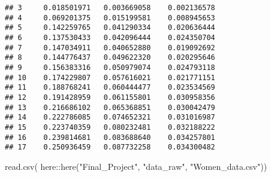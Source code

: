 \documentclass[
]{article}
\newenvironment{Shaded}{\begin{snugshade}}{\end{snugshade}}
\newcommand{\FunctionTok}[1]{\textcolor[rgb]{0.00,0.00,0.00}{#1}}
\newcommand{\NormalTok}[1]{#1}
\newcommand{\SpecialCharTok}[1]{\textcolor[rgb]{0.00,0.00,0.00}{#1}}
\newcommand{\StringTok}[1]{\textcolor[rgb]{0.31,0.60,0.02}{#1}}
\begin{document}
\begin{verbatim}
## 3     0.018501971   0.003669058    0.002136578
## 4     0.069201375   0.015199581    0.008945653
## 5     0.142259765   0.041290334    0.020636444
## 6     0.137530433   0.042096444    0.024350704
## 7     0.147034911   0.040652880    0.019092692
## 8     0.144776437   0.049622320    0.020295646
## 9     0.156383316   0.050979074    0.024793118
## 10    0.174229807   0.057616021    0.021771151
## 11    0.188768241   0.060444477    0.023534569
## 12    0.191428959   0.061155801    0.030958356
## 13    0.216686102   0.065368851    0.030042479
## 14    0.222786085   0.074652321    0.031016987
## 15    0.223740359   0.080232481    0.032188222
## 16    0.239814681   0.083688640    0.034257801
## 17    0.250936459   0.087732258    0.034300482
\end{verbatim}

\begin{Shaded}
\begin{Highlighting}[]
\FunctionTok{read.csv}\NormalTok{(}
\NormalTok{  here}\SpecialCharTok{::}\FunctionTok{here}\NormalTok{(}\StringTok{"Final\_Project"}\NormalTok{, }\StringTok{"data\_raw"}\NormalTok{, }\StringTok{"Women\_data.csv"}\NormalTok{))}
\end{Highlighting}
\end{Shaded}
\end{document}
